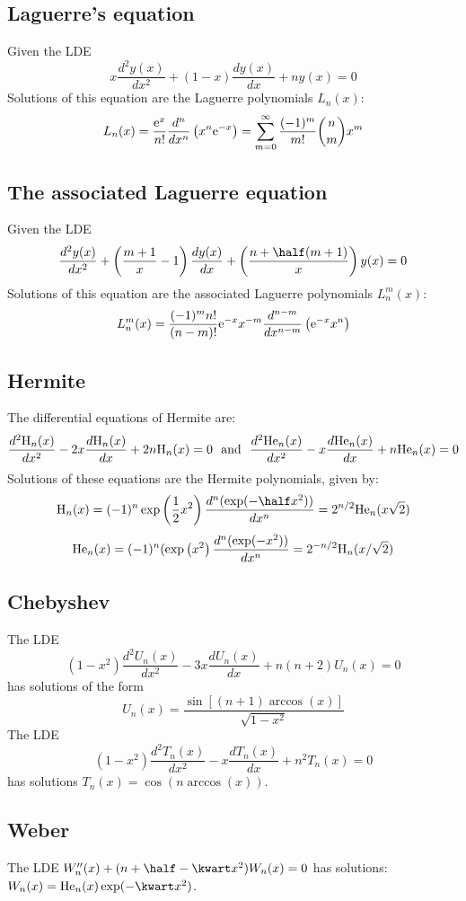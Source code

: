 \subsection{Laguerre's equation}
Given the LDE
\[
x\frac{d^2y(x)}{dx^2}+(1-x)\frac{dy(x)}{dx}+ny(x)=0
\]
Solutions of this equation are the Laguerre polynomials $L_n(x)$:
\[
L_n(x)=\frac{{\rm e}^x}{n!}\frac{d^n}{dx^n}\left(x^n{\rm e}^{-x}\right)=
\sum_{m=0}^\infty\frac{(-1)^m}{m!}{n\choose m}x^m
\]

\subsection{The associated Laguerre equation}
Given the LDE
\[
\frac{d^2y(x)}{dx^2}+\left(\frac{m+1}{x}-1\right)\frac{dy(x)}{dx}+\left(\frac{n+\half(m+1)}{x}\right)y(x)=0
\]
Solutions of this equation are the associated Laguerre polynomials $L_n^m(x)$:
\[
L_n^m(x)=\frac{(-1)^mn!}{(n-m)!}{\rm e}^{-x}x^{-m}\frac{d^{n-m}}{dx^{n-m}}\left({\rm e}^{-x}x^n\right)
\]

\subsection{Hermite}
\def\Hn{{\rm H}_n}
\def\Hen{{\rm He}_n}
The differential equations of Hermite are:
\[
\frac{d^2\Hn(x)}{dx^2}-2x\frac{d\Hn(x)}{dx}+2n\Hn(x)=0~~\mbox{and}~~
\frac{d^2\Hen(x)}{dx^2}-x\frac{d\Hen(x)}{dx}+n\Hen(x)=0
\]
Solutions of these equations are the Hermite polynomials, given by:
\[
\Hn(x)=(-1)^n\exp\left(\frac{1}{2}x^2\right)\frac{d^n(\exp(-\half x^2))}{dx^n}=2^{n/2}\Hen(x\sqrt{2})
\]
\[
\Hen(x)=(-1)^n(\exp\left(x^2\right)\frac{d^n(\exp(-x^2))}{dx^n}=2^{-n/2}\Hn(x/\sqrt{2})
\]

\subsection{Chebyshev}
The LDE
\[
(1-x^2)\frac{d^2U_n(x)}{dx^2}-3x\frac{dU_n(x)}{dx}+n(n+2)U_n(x)=0
\]
has solutions of the form
\[
U_n(x)=\frac{\sin[(n+1)\arccos(x)]}{\sqrt{1-x^2}}
\]
The LDE
\[
(1-x^2)\frac{d^2T_n(x)}{dx^2}-x\frac{dT_n(x)}{dx}+n^2T_n(x)=0
\]
has solutions $T_n(x)=\cos(n\arccos(x))$.

\subsection{Weber}
The LDE $W''_n(x)+(n+\half-\kwart x^2)W_n(x)=0$ has solutions:
$W_n(x)={\rm He}_n(x)\exp(-\kwart x^2)$.


